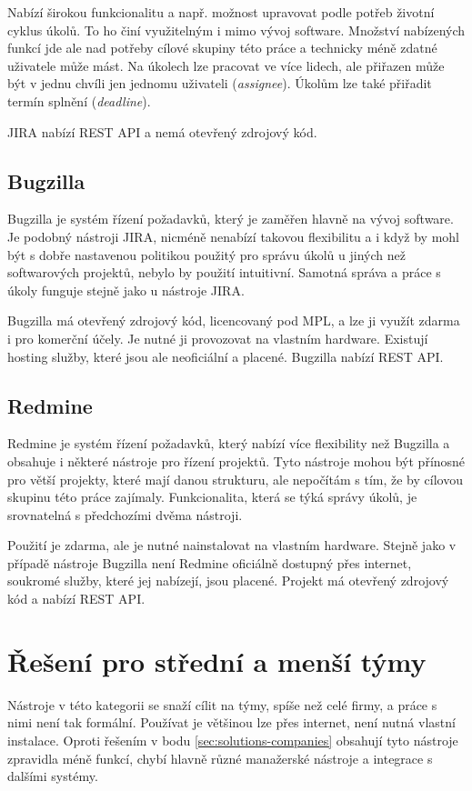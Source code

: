\documentclass[thesis=B,czech]{FITthesis}[2012/06/26]
\begin{document}
			Nabízí širokou funkcionalitu a např. možnost upravovat podle potřeb životní cyklus úkolů. To ho činí využitelným i mimo vývoj software. Množství nabízených funkcí jde ale nad potřeby cílové skupiny této práce a technicky méně zdatné uživatele může mást. Na úkolech lze pracovat ve více lidech, ale přiřazen může být v jednu chvíli jen jednomu uživateli (\textit{assignee}). Úkolům lze také přiřadit termín splnění (\textit{deadline}).
			
			JIRA nabízí REST API a nemá otevřený zdrojový kód.
			
		\subsection{Bugzilla}
			Bugzilla \cite{bugzilla} je systém řízení požadavků, který je zaměřen hlavně na vývoj software. Je podobný nástroji JIRA, nicméně nenabízí takovou flexibilitu a i když by mohl být s dobře nastavenou politikou použitý pro správu úkolů u jiných než softwarových projektů, nebylo by použití intuitivní. Samotná správa a práce s úkoly funguje stejně jako u nástroje JIRA.
			
			Bugzilla má otevřený zdrojový kód, licencovaný pod MPL, a lze ji využít zdarma i pro komerční účely. Je nutné ji provozovat na vlastním hardware. Existují hosting služby, které jsou ale neoficiální a placené. Bugzilla nabízí REST API.
			
		\subsection{Redmine}		
			Redmine \cite{redmine} je systém řízení požadavků, který nabízí více flexibility než Bugzilla a obsahuje i některé nástroje pro řízení projektů. Tyto nástroje mohou být přínosné pro větší projekty, které mají danou strukturu, ale nepočítám s tím, že by cílovou skupinu této práce zajímaly. Funkcionalita, která se týká správy úkolů, je srovnatelná s předchozími dvěma nástroji.
			
			Použití je zdarma, ale je nutné nainstalovat na vlastním hardware. Stejně jako v případě nástroje Bugzilla není Redmine oficiálně dostupný přes internet, soukromé služby, které jej nabízejí, jsou placené. Projekt má otevřený zdrojový kód a nabízí REST API.

	\section{Řešení pro střední a menší týmy}
		\label{sec:solutions-teams}
		Nástroje v této kategorii se snaží cílit na týmy, spíše než celé firmy, a práce s nimi není tak formální. Používat je většinou lze přes internet, není nutná vlastní instalace. Oproti řešením v bodu \ref{sec:solutions-companies} obsahují tyto nástroje zpravidla méně funkcí, chybí hlavně různé manažerské nástroje a integrace s dalšími systémy.
	
\end{document}
